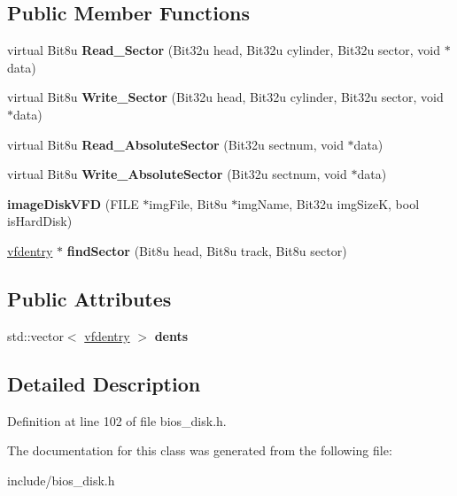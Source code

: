 \subsection*{Public Member Functions}
\begin{DoxyCompactItemize}
\item 
\hypertarget{classimageDiskVFD_a6829a1ce6b4030a5394a17104d6ab5e7}{virtual Bit8u {\bfseries Read\-\_\-\-Sector} (Bit32u head, Bit32u cylinder, Bit32u sector, void $\ast$data)}\label{classimageDiskVFD_a6829a1ce6b4030a5394a17104d6ab5e7}

\item 
\hypertarget{classimageDiskVFD_a2f1551f9626a407909fe2e8b852e8295}{virtual Bit8u {\bfseries Write\-\_\-\-Sector} (Bit32u head, Bit32u cylinder, Bit32u sector, void $\ast$data)}\label{classimageDiskVFD_a2f1551f9626a407909fe2e8b852e8295}

\item 
\hypertarget{classimageDiskVFD_a35f9dcce5281f4990a7640b3e6033257}{virtual Bit8u {\bfseries Read\-\_\-\-Absolute\-Sector} (Bit32u sectnum, void $\ast$data)}\label{classimageDiskVFD_a35f9dcce5281f4990a7640b3e6033257}

\item 
\hypertarget{classimageDiskVFD_a35857ca080ca913ac407de77b447ebeb}{virtual Bit8u {\bfseries Write\-\_\-\-Absolute\-Sector} (Bit32u sectnum, void $\ast$data)}\label{classimageDiskVFD_a35857ca080ca913ac407de77b447ebeb}

\item 
\hypertarget{classimageDiskVFD_a3d6b992a66cfce052569551fca9e137c}{{\bfseries image\-Disk\-V\-F\-D} (F\-I\-L\-E $\ast$img\-File, Bit8u $\ast$img\-Name, Bit32u img\-Size\-K, bool is\-Hard\-Disk)}\label{classimageDiskVFD_a3d6b992a66cfce052569551fca9e137c}

\item 
\hypertarget{classimageDiskVFD_a08fe9f9ae32fb55363d2b544c92c00c7}{\hyperlink{structimageDiskVFD_1_1vfdentry}{vfdentry} $\ast$ {\bfseries find\-Sector} (Bit8u head, Bit8u track, Bit8u sector)}\label{classimageDiskVFD_a08fe9f9ae32fb55363d2b544c92c00c7}

\end{DoxyCompactItemize}
\subsection*{Public Attributes}
\begin{DoxyCompactItemize}
\item 
\hypertarget{classimageDiskVFD_a9c11050c08b54c30cdb65f9c4250c856}{std\-::vector$<$ \hyperlink{structimageDiskVFD_1_1vfdentry}{vfdentry} $>$ {\bfseries dents}}\label{classimageDiskVFD_a9c11050c08b54c30cdb65f9c4250c856}

\end{DoxyCompactItemize}


\subsection{Detailed Description}


Definition at line 102 of file bios\-\_\-disk.\-h.



The documentation for this class was generated from the following file\-:\begin{DoxyCompactItemize}
\item 
include/bios\-\_\-disk.\-h\end{DoxyCompactItemize}
